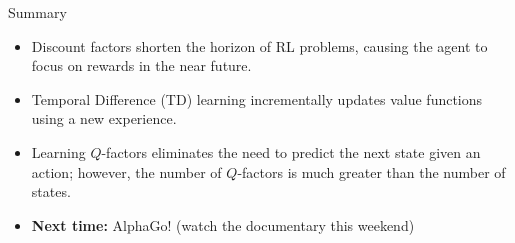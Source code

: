 \documentclass[9pt]{beamer}
\newcommand\lspace{\addtolength{\itemsep}{0.5\baselineskip}}
\begin{document}
\begin{frame}{Summary}

\begin{itemize}\lspace
	\item Discount factors shorten the horizon of RL problems, causing the agent to focus on rewards in the near future.
	\item Temporal Difference (TD) learning incrementally updates value functions using a new experience.
	\item Learning $Q$-factors eliminates the need to predict the next state given an action; however, the number of $Q$-factors is much greater than the number of states.
	\item<2-> \textbf{Next time:} AlphaGo! (watch the documentary this weekend)
\end{itemize}
	
\end{frame}
\end{document}
